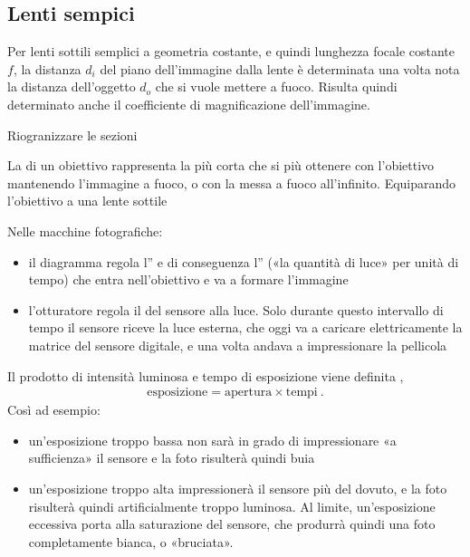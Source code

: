 \documentclass[letterpaper,10pt,italian]{jupyterBook}
\begin{document}
\subsection{Lenti sempici}
\label{\detokenize{ch/waves/optics-lens:lenti-sempici}}
\sphinxAtStartPar
Per lenti sottili semplici a geometria costante, e quindi lunghezza focale costante \(f\), la distanza \(d_i\) del piano dell’immagine dalla lente è determinata una volta nota la distanza dell’oggetto \(d_o\) che si vuole mettere a fuoco. Risulta quindi determinato anche il coefficiente di magnificazione dell’immagine.

\sphinxAtStartPar
{} Riogranizzare le sezioni

\sphinxAtStartPar
{} La  di un obiettivo rappresenta la  più corta che si più ottenere con l’obiettivo mantenendo l’immagine a fuoco, o con la messa a fuoco all’infinito. Equiparando l’obiettivo a una lente sottile 

\sphinxAtStartPar
{} Nelle macchine fotografiche:
\begin{itemize}
\item {} 
\sphinxAtStartPar
il diagramma regola l” e di conseguenza l” («la quantità di luce» per unità di tempo) che entra nell’obiettivo e va a formare l’immagine

\item {} 
\sphinxAtStartPar
l’otturatore regola il  del sensore alla luce. Solo durante questo intervallo di tempo il sensore riceve la luce esterna, che oggi va a caricare elettricamente la matrice del sensore digitale, e una volta andava a impressionare la pellicola

\end{itemize}

\sphinxAtStartPar
Il prodotto di intensità luminosa e tempo di esposizione viene definita ,
\begin{equation*}
\begin{split} \text{esposizione} = \text{apertura} \times \text{tempi} \ .\end{split}
\end{equation*}
\sphinxAtStartPar
Così ad esempio:
\begin{itemize}
\item {} 
\sphinxAtStartPar
un’esposizione troppo bassa non sarà in grado di impressionare «a sufficienza» il sensore e la foto risulterà quindi buia

\item {} 
\sphinxAtStartPar
un’esposizione troppo alta impressionerà il sensore più del dovuto, e la foto risulterà quindi artificialmente troppo luminosa. Al limite, un’esposizione eccessiva porta alla saturazione del sensore, che produrrà quindi una foto completamente bianca, o «bruciata».

\end{itemize}
\end{document}
